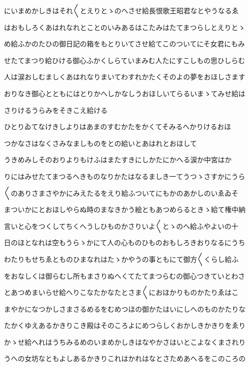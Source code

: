 \documentclass[a4paper,11pt,landscape]{ltjtarticle}
\begin{document}
にいまめかしきはそれ〱とえりとゝのへさせ給長恨歌王昭君なとやうなるゑ
\par\medskip
はおもしろくあはれなれとことのいみあるはこたみはたてまつらしとえりとゝ
\par\medskip
め給ふかのたひの御日記の箱をもとりいてさせ給てこのついてにそ女君にもみ
\par\medskip
せたてまつり給ひける御心ふかくしらていまみむ人たにすこしもの思ひしらむ
\par\medskip
人は涙おしむましくあはれなりまいてわすれかたくそのよの夢をおほしさます
\par\medskip
おりなき御心とともにはとりかへしかなしうおほしいてらるいまゝてみせ給は
\par\medskip
さりけるうらみをそきこえ給ける
\par\medskip
ひとりゐてなけきしよりはあまのすむかたをかくてそみるへかりけるおほ
\par\medskip
つかなさはなくさみなましものをとの給いとあはれとおほして
\par\medskip
うきめみしそのおりよりもけふはまたすきにしかたにかへる涙か中宮はか
\par\medskip
りにはみせたてまつるへきものなりかたはなるましき一てうつゝさすかにうら
\par\medskip
〱のありさまさやかにみえたるをえり給ふついてにもかのあかしのいゑゐそ
\par\medskip
まついかにとおほしやらぬ時のまなきかう絵ともあつめらるときゝ給て権中納
\par\medskip
言いと心をつくしてちくへうしひものかさりいよ〱とゝのへ給ふやよいの十
\par\medskip
日のほとなれは空もうらゝかにて人の心ものひものおもしろきおりなるにうち
\par\medskip
わたりもせちゑとものひまなれはたゝかやうの事ともにて御方〱くらし給ふ
\par\medskip
をおなしくは御らむし所もまさりぬへくてたてまつらむの御心つきていとわさ
\par\medskip
とあつめまいらせ給へりこなたかなたとさま〱におほかりものかたりゑはこ
\par\medskip
まやかになつかしさまさるめるをむめつほの御かたはいにしへのものかたりな
\par\medskip
たかくゆえあるかきりこき殿はそのころよにめつらしくおかしきかきりをゑり
\par\medskip
かゝせ給へれはうちみるめのいまめかしきはなやかさはいとこよなくまされり
\par\medskip
うへの女坊なともよしあるかきりこれはかれはなとさためあへるをこのころの
\end{document}
